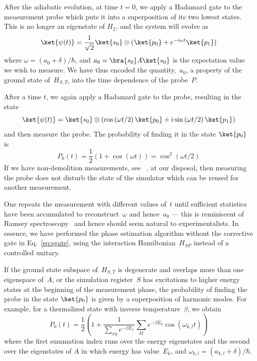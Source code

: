 \documentclass[11pt,oneside,final]{huthesis}%
\begin{document}
After the adiabatic evolution, at time $t=0$, we apply a Hadamard gate to the measurement probe 
which puts it into a superposition of its two lowest states.
This is no longer an eigenstate of $H_2$, and the system will
evolve as
\begin{equation}
\ket{\psi(t)} = \frac{1}{\sqrt{2}} \ket{s_0} \otimes (\ket{p_0} +
e^{-i  \omega t}\ket{p_1})
\end{equation}
where $\omega = (a_0+\delta)/\hbar$,
and $a_0 = \bra{s_0} A \ket{s_0}$
is the expectation value we wish to measure.
We have thus encoded the
quantity,~$a_0$, a property of the ground state of~$H_{S,T}$, into the
time dependence of the probe~$P$.


After a time $t$, we again apply a Hadamard gate to the probe,
resulting in the state
\begin{equation}\label{eqn:phase}
\ket{\psi(t)} = \ket{s_0} \otimes \left(\cos \left(\omega t /2\right)
\ket{p_0} +i \sin \left(\omega t /2\right) \ket{p_1}\right)
\end{equation}
and then measure the probe. The probability of finding it in the state
$\ket{p_0}$ is
\begin{equation}
\label{eqn:prob}
P_0(t) = \frac{1}{2}\left(1 + \cos(\omega t)\right) =
\cos^2\left(\omega t /2\right)
\end{equation}
If we have non-demolition measurements, see \eg~\cite{Siddiqi05}, at
our disposal, then measuring the probe does not disturb the state of
the simulator which can
be reused for another measurement. 

One repeats the measurement with different values of~$t$ until
sufficient statistics have been accumulated to reconstruct~$\omega$
and hence~$a_0$ --- this is reminiscent of Ramsey
spectroscopy~\cite{Ramsey63} and hence should seem natural to
experimentalists. In essence, we have performed the phase estimation
algorithm without the corrective gate in Eq.~\eqref{eq:sgate}, using the interaction
Hamiltonian~$H_{SP}$ instead of a controlled unitary.

If the ground state subspace of~$H_{S,T}$ is degenerate and overlaps
more than one eigenspace of~$A$, or
the simulation register~$S$ has excitations to higher
energy states at the beginning of the measurement phase,
the probability of finding the probe in the state $\ket{p_0}$ is given
by a superposition of harmonic modes. For example, for a thermalized state
with inverse temperature~$\beta$, we obtain
\begin{equation}
\label{eqn:prob2}
P_0(t) = \frac{1}{2}\left(1 +\frac{1}{\sum_{xy} e^{-\beta E_x}} \sum_{kl} e^{-\beta E_k} \cos(\omega_{k,l} t)\right)
\end{equation}
where the first summation index runs over the energy eigenstates and
the second over the eigenstates of
$A$ in which energy has value~$E_k$, and $\omega_{k,l} = (a_{k,l}+\delta)/\hbar$.
\end{document}
